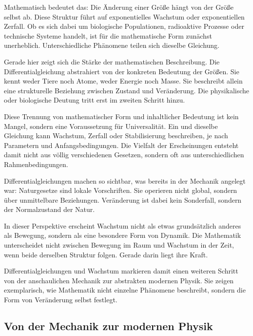 Mathematisch bedeutet das:
Die Änderung einer Größe hängt von der Größe selbst ab.
Diese Struktur führt auf exponentielles Wachstum
oder exponentiellen Zerfall.
Ob es sich dabei um biologische Populationen,
radioaktive Prozesse
oder technische Systeme handelt,
ist für die mathematische Form zunächst unerheblich.
Unterschiedliche Phänomene teilen sich dieselbe Gleichung.

Gerade hier zeigt sich die Stärke der mathematischen Beschreibung.
Die Differentialgleichung abstrahiert
von der konkreten Bedeutung der Größen.
Sie kennt weder Tiere noch Atome,
weder Energie noch Masse.
Sie beschreibt allein
eine strukturelle Beziehung zwischen Zustand und Veränderung.
Die physikalische oder biologische Deutung
tritt erst im zweiten Schritt hinzu.

Diese Trennung von mathematischer Form
und inhaltlicher Bedeutung
ist kein Mangel,
sondern eine Voraussetzung für Universalität.
Ein und dieselbe Gleichung kann Wachstum,
Zerfall oder Stabilisierung beschreiben,
je nach Parametern
und Anfangsbedingungen.
Die Vielfalt der Erscheinungen entsteht damit nicht aus völlig verschiedenen Gesetzen,
sondern oft aus unterschiedlichen Rahmenbedingungen.

Differentialgleichungen machen so sichtbar,
was bereits in der Mechanik angelegt war:
Naturgesetze sind lokale Vorschriften.
Sie operieren nicht global,
sondern über unmittelbare Beziehungen.
Veränderung ist dabei kein Sonderfall,
sondern der Normalzustand der Natur.

In dieser Perspektive erscheint Wachstum
nicht als etwas grundsätzlich anderes als Bewegung,
sondern als eine besondere Form von Dynamik.
Die Mathematik
unterscheidet nicht zwischen Bewegung im Raum
und Wachstum in der Zeit,
wenn beide derselben Struktur folgen.
Gerade darin liegt ihre Kraft.

Differentialgleichungen und Wachstum markieren damit
einen weiteren Schritt
von der anschaulichen Mechanik
zur abstrakten modernen Physik.
Sie zeigen exemplarisch,
wie Mathematik nicht einzelne Phänomene beschreibt,
sondern die Form von Veränderung selbst festlegt.
\subsection{Von der Mechanik zur modernen Physik}

